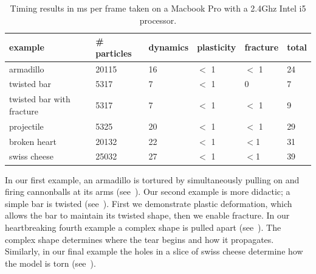 \documentclass[review]{acmsiggraph}
\begin{document}
\begin{table}
\begin{center}
\caption{Timing results in ms per frame taken on a Macbook Pro with a 2.4Ghz Intel i5 processor.}
\label{table:timing}
\begin{tabular}{|l|l|l|l|l|l|}
\hline
example & \# particles & dynamics & plasticity & fracture & total\\
\hline
armadillo & 20115 & 16  & $<$ 1 & $<$ 1 & 24\\
twisted bar & 5317 & 7 & $<$ 1  & 0 & 7\\
twisted bar with fracture & 5317 & 7  & $<$ 1 & $<$ 1 & 9 \\
projectile & 5325 & 20 & $<$ 1 & $<$ 1 & 29\\
broken heart & 20132 & 22 & $<$ 1 & $<$1 & 31\\
swiss cheese & 25032 & 27 & $<$ 1 & $<$1 & 39 \\
\hline
\end{tabular}
\end{center}
\end{table}

In our first example, an armadillo is tortured by simultaneously pulling on and firing
cannonballs at its arms (see~).
Our second example is more didactic; a simple bar is twisted (see~).  First we demonstrate 
plastic deformation, which allows the bar to maintain its twisted shape, then we enable fracture.  
In our heartbreaking fourth example a complex shape is pulled apart (see~).  The complex shape determines
where the tear begins and how it propagates.  Similarly, in our final example the holes in a 
slice of swiss cheese determine how the model is torn (see~).


\end{document}
